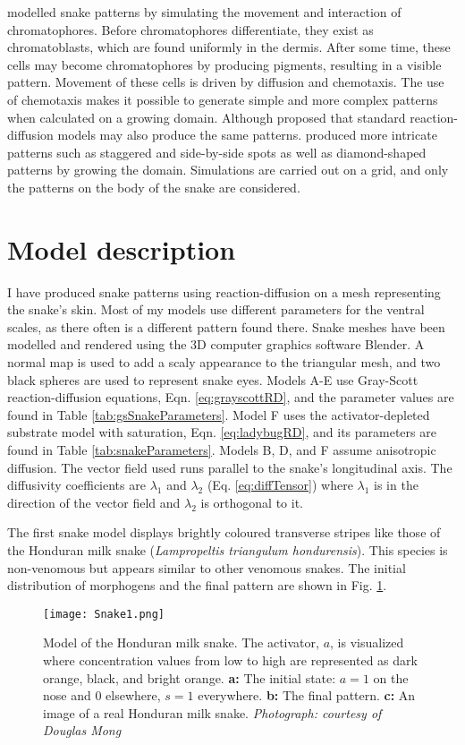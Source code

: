 \citet{murray1991} modelled snake patterns by simulating the movement and interaction of chromatophores. Before chromatophores differentiate, they exist as chromatoblasts, which are found uniformly in the dermis. After some time, these cells may become chromatophores by producing pigments, resulting in a visible pattern. Movement of these cells is driven by diffusion and chemotaxis. The use of chemotaxis makes it possible to generate simple and more complex patterns when calculated on a growing domain. Although \citet{murray1991} proposed that standard reaction-diffusion models may also produce the same patterns. \citet{murray1991} produced more intricate patterns such as staggered and side-by-side spots as well as diamond-shaped patterns by growing the domain. Simulations are carried out on a grid, and only the patterns on the body of the snake are considered.

\section{Model description}
I have produced snake patterns using reaction-diffusion on a mesh representing the snake's skin. Most of my models use different parameters for the ventral scales, as there often is a different pattern found there. Snake meshes have been modelled and rendered using the 3D computer graphics software Blender. A normal map is used to add a scaly appearance to the triangular mesh, and two black spheres are used to represent snake eyes. Models A-E use Gray-Scott reaction-diffusion equations, Eqn. \ref{eq:grayscottRD}, and the parameter values are found in Table \ref{tab:gsSnakeParameters}. Model F uses the activator-depleted substrate model with saturation, Eqn. \ref{eq:ladybugRD}, and its parameters are found in Table \ref{tab:snakeParameters}. Models B, D, and F assume anisotropic diffusion. The vector field used runs parallel to the snake's longitudinal axis. The diffusivity coefficients are $\lambda_{1}$ and $\lambda_{2}$ (Eq. \ref{eq:diffTensor}) where $\lambda_{1}$ is in the direction of the vector field and $\lambda_{2}$ is orthogonal to it. 

\newpage
The first snake model displays brightly coloured transverse stripes like those of the Honduran milk snake (\textit{Lampropeltis triangulum hondurensis}). This species is non-venomous but appears similar to other venomous snakes. The initial distribution of morphogens and the final pattern are shown in Fig. \ref{fig:Snake1}.

\begin{figure}[ht]
	\centering
	\texttt{[image: Snake1.png]}
	\caption{Model of the Honduran milk snake. The activator, $a$, is visualized where concentration values from low to high are represented as dark orange, black, and bright orange. \textbf{a:} The initial state: $a=1$ on the nose and $0$ elsewhere, $s=1$ everywhere. \textbf{b:} The final pattern. \textbf{c:} An image of a real Honduran milk snake. \textit{Photograph: courtesy of Douglas Mong}}
	\label{fig:Snake1}
\end{figure}

